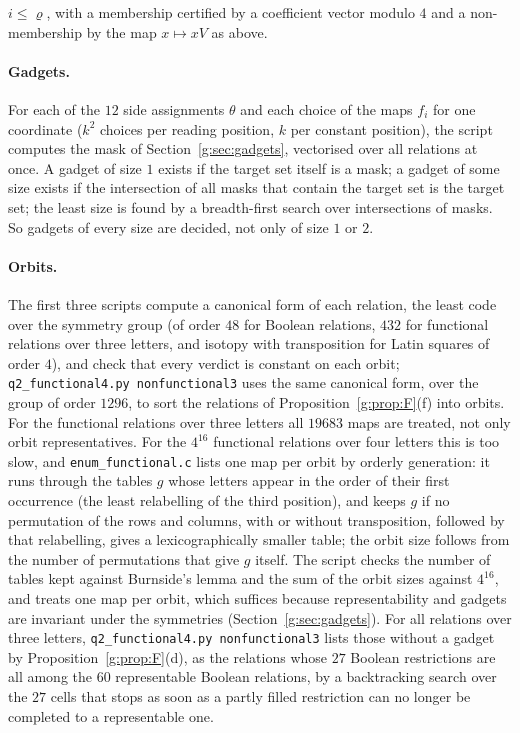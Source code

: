\documentclass[11pt]{article}
\theoremstyle{definition}
\theoremstyle{remark}
\begin{document}
$i\le\varrho$, with a membership certified by a coefficient vector modulo $4$ and a non-membership by the map $x\mapsto xV$ as above.

\paragraph{Gadgets.} For each of the $12$ side assignments $\theta$ and each choice of the maps $f_{i}$ for one coordinate ($k^2$ choices per reading position, $k$ per constant position), the script computes the mask of Section~\ref{g:sec:gadgets}, vectorised over all relations at once. A gadget of size $1$ exists if the target set itself is a mask; a gadget of some size exists if the intersection of all masks that contain the target set is the target set; the least size is found by a breadth-first search over intersections of masks. So gadgets of every size are decided, not only of size $1$ or $2$.

\paragraph{Orbits.} The first three scripts compute a canonical form of each relation, the least code over the symmetry group (of order $48$ for Boolean relations, $432$ for functional relations over three letters, and isotopy with transposition for Latin squares of order $4$), and check that every verdict is constant on each orbit; \texttt{q2\_functional4.py nonfunctional3} uses the same canonical form, over the group of order $1296$, to sort the relations of Proposition~\ref{g:prop:F}(f) into orbits. For the functional relations over three letters all $19683$ maps are treated, not only orbit representatives. For the $4^{16}$ functional relations over four letters this is too slow, and \texttt{enum\_functional.c} lists one map per orbit by orderly generation: it runs through the tables $g$ whose letters appear in the order of their first occurrence (the least relabelling of the third position), and keeps $g$ if no permutation of the rows and columns, with or without transposition, followed by that relabelling, gives a lexicographically smaller table; the orbit size follows from the number of permutations that give $g$ itself. The script checks the number of tables kept against Burnside's lemma and the sum of the orbit sizes against $4^{16}$, and treats one map per orbit, which suffices because representability and gadgets are invariant under the symmetries (Section~\ref{g:sec:gadgets}). For all relations over three letters, \texttt{q2\_functional4.py nonfunctional3} lists those without a gadget by Proposition~\ref{g:prop:F}(d), as the relations whose $27$ Boolean restrictions are all among the $60$ representable Boolean relations, by a backtracking search over the $27$ cells that stops as soon as a partly filled restriction can no longer be completed to a representable one.
\end{document}

